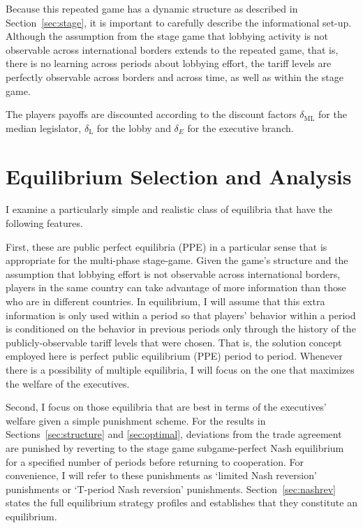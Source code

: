 \documentclass[authoryear, review]{elsarticle}
\newcommand{\de}{\delta}
\begin{document}
Because this repeated game has a dynamic structure as described in Section~\ref{sec:stage}, it is important to carefully describe the informational set-up. Although the assumption from the stage game that lobbying activity is not observable across international borders extends to the repeated game, that is, there is no learning across periods about lobbying effort, the tariff levels are perfectly observable across borders and across time, as well as within the stage game.

The players payoffs are discounted according to the discount factors $\de_\text{ML}$ for the median legislator, $\de_\text{L}$ for the lobby and $\de_E$ for the executive branch.


\section{Equilibrium Selection and Analysis}
\label{sec:eqm}
I examine a particularly simple and realistic class of equilibria that have the following features.

First, these are public perfect equilibria (PPE) in a particular sense that is appropriate for the multi-phase stage-game. Given the game's structure and the assumption that lobbying effort is not observable across international borders, players in the same country can take advantage of more information than those who are in different countries. In equilibrium, I will assume that this extra information is only used within a period so that players' behavior within a period is conditioned on the behavior in previous periods only through the history of the publicly-observable tariff levels that were chosen. That is, the solution concept employed here is perfect public equilibrium (PPE) period to period. Whenever there is a possibility of multiple equilibria, I will focus on the one that maximizes the welfare of the executives. 

Second, I focus on those equilibria that are best in terms of the executives' welfare given a simple punishment scheme. For the results in Sections~\ref{sec:structure} and \ref{sec:optimal}, deviations from the trade agreement are punished by reverting to the stage game subgame-perfect Nash equilibrium for a specified number of periods before returning to cooperation. For convenience, I will refer to these punishments as `limited Nash reversion' punishments or `T-period Nash reversion' punishments. Section~\ref{sec:nashrev} states the full equilibrium strategy profiles and establishes that they constitute an equilibrium.
\end{document}
